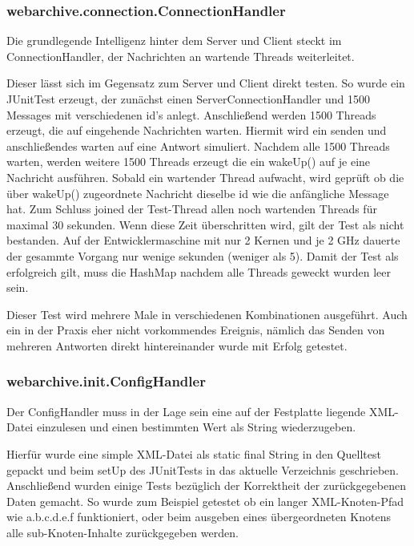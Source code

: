 	\subsubsection{webarchive.connection.ConnectionHandler}
		Die grundlegende Intelligenz hinter dem Server und Client steckt im ConnectionHandler, der Nachrichten an wartende Threads weiterleitet.
		
		Dieser lässt sich im Gegensatz zum Server und Client direkt testen.
		So wurde ein JUnitTest erzeugt, der zunächst einen ServerConnectionHandler und 1500 Messages mit verschiedenen id's anlegt.
		Anschließend werden 1500 Threads erzeugt, die auf eingehende Nachrichten warten.
		Hiermit wird ein senden und anschließendes warten auf eine Antwort simuliert.
		Nachdem alle 1500 Threads warten, werden weitere 1500 Threads erzeugt die ein wakeUp() auf je eine Nachricht ausführen.
		Sobald ein wartender Thread aufwacht, wird geprüft ob die über wakeUp() zugeordnete Nachricht dieselbe id wie die anfängliche Message hat.
		Zum Schluss joined der Test-Thread allen noch wartenden Threads für maximal 30 sekunden. Wenn diese Zeit überschritten wird, gilt der Test als nicht bestanden.
		Auf der Entwicklermaschine mit nur 2 Kernen und je 2 GHz dauerte der gesammte Vorgang nur wenige sekunden (weniger als 5).
		Damit der Test als erfolgreich gilt, muss die HashMap nachdem alle Threads geweckt wurden leer sein.
		
		Dieser Test wird mehrere Male in verschiedenen Kombinationen ausgeführt.
		Auch ein in der Praxis eher nicht vorkommendes Ereignis, nämlich das Senden von mehreren Antworten direkt hintereinander wurde mit Erfolg getestet.
		
	\subsubsection{webarchive.init.ConfigHandler}
		Der ConfigHandler muss in der Lage sein eine auf der Festplatte liegende XML-Datei einzulesen und einen bestimmten Wert als String wiederzugeben.
		
		Hierfür wurde eine simple XML-Datei als static final String in den Quelltest gepackt und beim setUp des JUnitTests in das aktuelle Verzeichnis geschrieben.
		Anschließend wurden einige Tests bezüglich der Korrektheit der zurückgegebenen Daten gemacht.
		So wurde zum Beispiel getestet ob ein langer XML-Knoten-Pfad wie a.b.c.d.e.f funktioniert, oder beim ausgeben eines übergeordneten Knotens alle sub-Knoten-Inhalte zurückgegeben werden.
		
